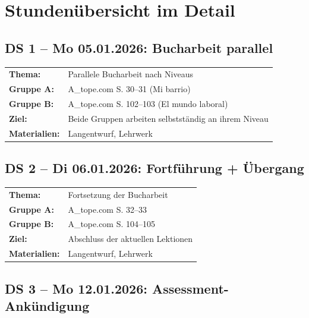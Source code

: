 \documentclass[11pt, a4paper]{article}
\begin{document}
\newpage


\section*{Stundenübersicht im Detail}

\subsection*{DS 1 -- Mo 05.01.2026: Bucharbeit parallel}

\begin{tabular}{ll}
\textbf{Thema:} & Parallele Bucharbeit nach Niveaus \\
\textbf{Gruppe A:} & A\_tope.com S. 30--31 (Mi barrio) \\
\textbf{Gruppe B:} & A\_tope.com S. 102--103 (El mundo laboral) \\
\textbf{Ziel:} & Beide Gruppen arbeiten selbstständig an ihrem Niveau \\
\textbf{Materialien:} & Langentwurf, Lehrwerk \\
\end{tabular}

\vspace{0.5cm}

\subsection*{DS 2 -- Di 06.01.2026: Fortführung + Übergang}

\begin{tabular}{ll}
\textbf{Thema:} & Fortsetzung der Bucharbeit \\
\textbf{Gruppe A:} & A\_tope.com S. 32--33 \\
\textbf{Gruppe B:} & A\_tope.com S. 104--105 \\
\textbf{Ziel:} & Abschluss der aktuellen Lektionen \\
\textbf{Materialien:} & Langentwurf, Lehrwerk \\
\end{tabular}

\vspace{0.5cm}

\subsection*{DS 3 -- Mo 12.01.2026: Assessment-Ankündigung}
\end{document}
